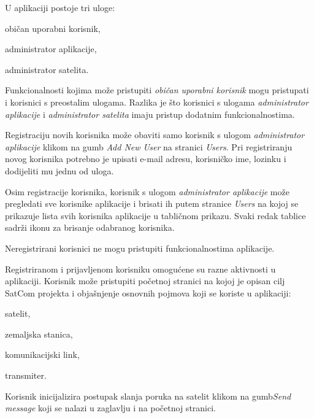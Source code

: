        { U aplikaciji postoje tri uloge:
        \begin{packed_item}
            \item običan uporabni korisnik,
            \item administrator aplikacije,
            \item administrator satelita.
        \end{packed_item}
        {Funkcionalnosti kojima može pristupiti \textit{običan uporabni korisnik} mogu pristupati i korisnici s preostalim ulogama. Razlika je što korisnici s ulogama \textit{administrator aplikacije} i \textit{administrator satelita} imaju pristup dodatnim funkcionalnostima.} \par
        
        {Registraciju novih korisnika može obaviti samo korisnik s ulogom \textit{administrator aplikacije} klikom na gumb \textit{Add New User} na stranici \textit{Users}. Pri registriranju novog korisnika potrebno je upisati e-mail adresu, korisničko ime, lozinku i dodijeliti mu jednu od uloga.} \par
        {Osim registracije korisnika, korisnik s ulogom \textit{administrator aplikacije} može pregledati sve korisnike aplikacije i brisati ih putem stranice \textit{Users} na kojoj se prikazuje lista svih korisnika aplikacije u tabličnom prikazu. Svaki redak tablice sadrži ikonu za brisanje odabranog korisnika.} \par

        {Neregistrirani korisnici ne mogu pristupiti funkcionalnostima aplikacije.} \par
        
        {Registriranom i prijavljenom korisniku omogućene su razne aktivnosti u aplikaciji. Korisnik može pristupiti početnoj stranici na kojoj je opisan cilj SatCom projekta i objašnjenje osnovnih pojmova koji se koriste u aplikaciji: 
        \begin{packed_item}
            \item satelit,
            \item zemaljska stanica,
            \item komunikacijski link, 
            \item transmiter.
        \end{packed_item}
        Korisnik inicijalizira postupak slanja poruka na satelit klikom na gumb\newline \textit{Send message} koji se nalazi u zaglavlju i na početnoj stranici. \par
        
}}
